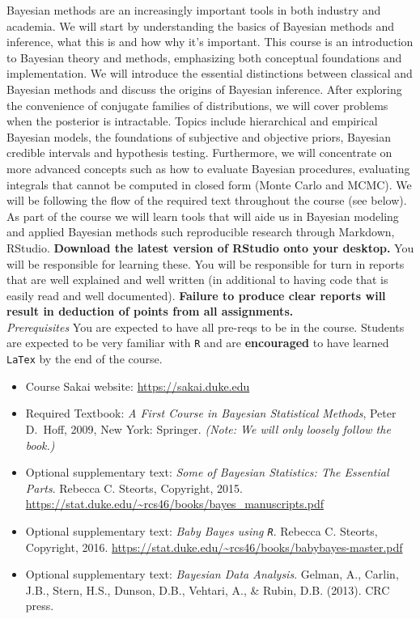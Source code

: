 \documentclass[11pt]{article}
\begin{document}
Bayesian methods are an increasingly important tools
in both industry and academia. We will start by understanding the basics of Bayesian methods and inference, what this is and how why it's important. 
This course is an introduction to Bayesian theory and methods, emphasizing both conceptual foundations and implementation. We will introduce the essential distinctions between classical and Bayesian methods and discuss the origins of Bayesian inference. After exploring the convenience of conjugate families of distributions, we will cover problems when the posterior is intractable. Topics include hierarchical and empirical Bayesian models, the foundations of subjective and objective priors, Bayesian credible intervals and hypothesis testing. Furthermore, we 
will  concentrate on more advanced concepts such as how to evaluate Bayesian procedures, evaluating integrals that cannot be computed in closed form (Monte Carlo and MCMC). We will be following the flow of the required text throughout the course (see below). \\

As part of the course we will learn tools that will aide us in Bayesian modeling and applied Bayesian methods such reproducible research through Markdown, RStudio. \textbf{Download the latest version of RStudio onto your desktop.} You will be responsible for learning these. You will be responsible for turn in reports that are well explained and well written (in additional to having code that is easily read and well documented). \textbf{Failure to produce clear reports will result in deduction of points from all assignments.} 
\\

\emph{Prerequisites} You are expected to have all pre-reqs to be in the course. Students are expected to be very familiar with \texttt{R} and are \textbf{encouraged} to have learned \texttt{LaTex} by the end of the course. 


\begin{itemize}
\item[] Course Sakai website: \url{https://sakai.duke.edu}
\item[] Required Textbook: \textit{A First Course in Bayesian Statistical Methods}, Peter D.\ Hoff, 2009, New York: Springer. \textit{(Note: We will only loosely follow the book.)}
\item[] Optional supplementary text:  \textit{Some of Bayesian Statistics: The Essential Parts}. Rebecca C. Steorts, Copyright, 2015. \url{https://stat.duke.edu/~rcs46/books/bayes_manuscripts.pdf}
\item[] Optional supplementary text:  \textit{Baby Bayes using \texttt{R}}. Rebecca C. Steorts, Copyright, 2016. 
\url{https://stat.duke.edu/~rcs46/books/babybayes-master.pdf}
\item[] Optional supplementary text:  \textit{Bayesian Data Analysis}. Gelman, A., Carlin, J.B., Stern, H.S., Dunson, D.B., Vehtari, A., \& Rubin, D.B. (2013). CRC press.
\end{itemize}
\end{document}
